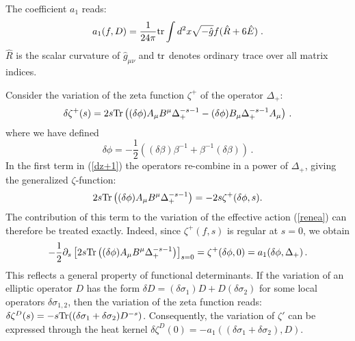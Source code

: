 \documentclass[a4paper,12pt]{article}
\begin{document}
The coefficient $a_1$ reads:
\begin{equation}
a_1 (f, D)=\frac 1{24\pi} {\rm tr}
\int d^2x\sqrt{-\hat g} f  
(\hat R+6\hat E)\; .
\label{a1}
\end{equation}
$\hat R$ is the scalar curvature of $\hat g_{\mu\nu}$ and
$\rm tr$ denotes ordinary trace over all matrix indices.

Consider the variation of the zeta function $\zeta^+$ of
the operator $\Delta_+$:
\begin{equation}
\delta \zeta^+(s)= 2s {\rm Tr} \left( (\delta \phi )
A_\mu B^\mu \Delta_+^{-s-1}
-(\delta \phi ) B_\mu \Delta_+^{-s-1} A_\mu \right)\,.
\label{dz+1}
\end{equation}
where we have defined
\begin{equation}
\delta\phi =-\frac 12 ((\delta\beta)\beta^{-1} +
\beta^{-1}(\delta\beta))\,. \label{6dphi}
\end{equation}
In the first term in (\ref{dz+1}) the operators re-combine
in a power of $\Delta_+$, giving the generalized $\zeta$-function:
\begin{equation}
  2s {\rm Tr} \left( (\delta \phi )
A_\mu B^\mu \Delta_+^{-s-1} \right)=
-2s \zeta^+ (\delta \phi ,s) . 
\label{1stterm}
\end{equation}
The contribution of this term to the variation of the effective
action (\ref{renea})
can therefore be treated exactly. Indeed, since $\zeta^+(f,s)$
is regular at $s=0$, we obtain
\begin{equation}
-\frac 12 \partial_s \left[ 2s {\rm Tr} \left( (\delta \phi )
A_\mu B^\mu \Delta_+^{-s-1} \right)\right]_{s=0}=
\zeta^+ (\delta \phi ,0)=a_1(\delta\phi ,\Delta_+ )\,.
\label{1stterm2}
\end{equation}
This reflects a general property of functional determinants.
If the variation of an elliptic operator $D$ has the form
$\delta D=(\delta\sigma_1)D +D(\delta\sigma_2)$ for
some local operators $\delta\sigma_{1,2}$, then the variation of 
the zeta function reads: 
$\delta \zeta^D(s)=-s{\rm Tr}((\delta\sigma_1 +\delta\sigma_2)D^{-s})$.
Consequently, the variation of $\zeta'$ can be expressed
through the heat kernel 
$\delta \zeta^D(0)=-a_1((\delta\sigma_1 +\delta\sigma_2),D)$.
\end{document}
